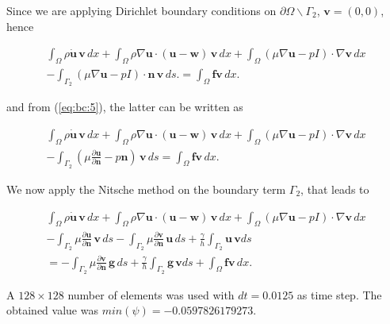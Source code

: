 \documentclass[a4paper,11pt,openright,twoside]{book}
\begin{document}
Since we are applying Dirichlet boundary conditions on $\partial \Omega \backslash \Gamma_2$, $\mathbf{v} = (0,0)$, hence 

\begin{align}
\int_{\Omega} \rho \dot{\mathbf{u}} \, \mathbf{v} \, dx
+ \int_{\Omega} \rho \nabla \mathbf{u} \cdot (\mathbf{u} - \mathbf{w}) \, \mathbf{v} \, dx
+ \int_{\Omega} (\mu \nabla \mathbf{u} - pI) \cdot \nabla \mathbf{v} \, dx \\
- \int_{\Gamma_2} (\mu \nabla \mathbf{u} - pI) \cdot \mathbf{n} \, \mathbf{v} \, ds.
= \int_{\Omega} \mathbf{f} \mathbf{v} \, dx.
\end{align}

and from (\ref{eq:bc:5}), the latter can be written as

\begin{align}
\int_{\Omega} \rho \dot{\mathbf{u}} \, \mathbf{v} \, dx
+ \int_{\Omega} \rho \nabla \mathbf{u} \cdot (\mathbf{u} - \mathbf{w}) \, \mathbf{v} \, dx
+ \int_{\Omega} (\mu \nabla \mathbf{u} - pI) \cdot \nabla \mathbf{v} \, dx \\
- \int_{\Gamma_2} (\mu \frac{\partial \mathbf{u}}{\partial \mathbf{n}} -  p \mathbf{n}) \, \mathbf{v} \, ds
= \int_{\Omega} \mathbf{f} \mathbf{v} \, dx.
\end{align}

We now apply the Nitsche method on the boundary term $\Gamma_2$, that leads to

\begin{align}
\int_{\Omega} \rho \dot{\mathbf{u}} \, \mathbf{v} \, dx
+ \int_{\Omega} \rho \nabla \mathbf{u} \cdot (\mathbf{u} - \mathbf{w}) \, \mathbf{v} \, dx
+ \int_{\Omega} (\mu \nabla \mathbf{u} - pI) \cdot \nabla \mathbf{v} \, dx \\
- \int_{\Gamma_2} \mu \frac{\partial \mathbf{u}}{\partial \mathbf{n}} \, \mathbf{v} \, ds
- \int_{\Gamma_2} \mu \frac{\partial \mathbf{v}}{\partial \mathbf{n}}  \, \mathbf{u} \, ds
+ \frac{\gamma}{h} \int_{\Gamma_2} \mathbf{u \, v} ds \\
= - \int_{\Gamma_2} \mu \frac{\partial \mathbf{v}}{\partial \mathbf{n}}  \, \mathbf{g} \, ds
+ \frac{\gamma}{h} \int_{\Gamma_2} \mathbf{g \, v} ds
+  \int_{\Omega} \mathbf{f} \mathbf{v} \, dx.
\end{align}

A $128 \times 128$ number of elements was used with $dt = 0.0125$ as time step. The obtained value was $min(\psi) = -0.0597826179273$. 
\end{document}
